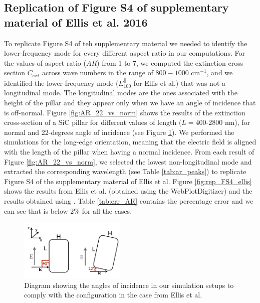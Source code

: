 \subsection{Replication of Figure S4 of supplementary material of Ellis et al. 2016}

To replicate Figure S4 of teh supplementary material we needed to identify the lower-frequency mode for every different 
aspect ratio in our computations. For the values of aspect ratio ($AR$) from 1 to 7, we computed the extinction cross section 
$C_{ext}$ across wave numbers in the range of $800-1000$ cm$^{-1}$, and we identified the lower-frequency mode 
($E^{\parallel}_{100}$ for Ellis et al.) that was not a longitudinal mode. The longitudinal modes are the ones associated with 
the height of the pillar and they appear only when we have an angle of incidence that is off-normal. 
Figure \ref{fig:AR_22_vs_norm} shows the results of the extinction cross-section of a SiC pillar for different values of 
length ($L=400$-$2800$ nm), for normal and 22-degrees angle of incidence (see Figure \ref{fig:ellis_ang_inc}). We performed 
the simulations for the long-edge orientation, meaning that the electric field is aligned with the length of the pillar when having a normal 
incidence. From each result of Figure \ref{fig:AR_22_vs_norm}, we selected the lowest non-longitudinal mode and extracted the corresponding wavelength
(see Table \ref{tab:ar_peaks}) to replicate Figure S4 of the supplementary material of Ellis et al. Figure \ref{fig:rep_FS4_ellis} shows the
results from Ellis et al. (obtained using the WebPlotDigitizer) and the results obtained using \pygbe. Table \ref{tab:err_AR} contains the 
percentage error and we can see that is below 2$\%$ for all the cases.

\begin{figure}
    \centering
    \includegraphics[width=0.45\textwidth]{ellis_ang_inc.pdf} 
    \caption{Diagram showing the angles of incidence in our simulation setups to comply with the configuration in the case from Ellis et al.}
    \label{fig:ellis_ang_inc}
\end{figure}

